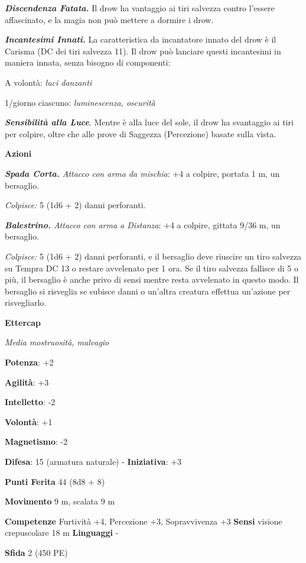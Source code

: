 \begin{multicols}{2}
\emph{\textbf{Discendenza Fatata.}} Il drow ha vantaggio ai tiri
salvezza contro l'essere affascinato, e la magia non può mettere a
dormire i drow.

\emph{\textbf{Incantesimi Innati.}} La caratteristica da incantatore
innato del drow è il Carisma (DC dei tiri salvezza 11). Il drow può
lanciare questi incantesimi in maniera innata, senza bisogno di
componenti:

A volontà: \emph{luci danzanti}

1/giorno ciascuno: \emph{luminescenza, oscurità}

\emph{\textbf{Sensibilità alla Luce}}. Mentre è alla luce del sole, il
drow ha svantaggio ai tiri per colpire, oltre che alle prove di Saggezza
(Percezione) basate sulla vista.

\smallskip\textbf{Azioni}

\emph{\textbf{Spada Corta.} Attacco con arma da mischia}: +4 a colpire,
portata 1 m, un bersaglio.

\emph{Colpisce:} 5 (1d6 + 2) danni perforanti.

\emph{\textbf{Balestrino.} Attacco con arma a Distanza}: +4 a colpire,
gittata 9/36 m, un bersaglio.

\emph{Colpisce:} 5 (1d6 + 2) danni perforanti, e il bersaglio deve
riuscire un tiro salvezza su Tempra DC 13 o restare avvelenato per
1 ora. Se il tiro salvezza fallisce di 5 o più, il bersaglio è anche
privo di sensi mentre resta avvelenato in questo modo. Il bersaglio si
risveglia se subisce danni o un'altra creatura effettua un'azione per
risvegliarlo.



\textbf{Ettercap}

\emph{Media mostruosità, malvagio}

\textbf{Potenza}: +2

\textbf{Agilità}: +3

\textbf{Intelletto}: -2

\textbf{Volontà}: +1

\textbf{Magnetismo}: -2

\textbf{Difesa}: 15 (armatura naturale) - \textbf{Iniziativa}: +3

\textbf{Punti Ferita} 44 (8d8 + 8)

\textbf{Movimento} 9 m, scalata 9 m

\textbf{Competenze} Furtività +4, Percezione +3, Sopravvivenza +3
\textbf{Sensi} visione crepuscolare 18 m
\textbf{Linguaggi} -

\textbf{Sfida} 2 (450 PE)\smallskip


\end{multicols}
